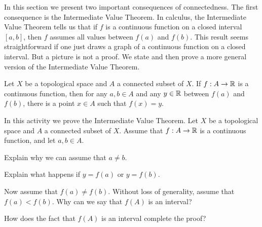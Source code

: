 \label{sec_ivt_fpt}

In this section we present two important consequences of connectedness. The first consequence is the Intermediate Value Theorem. In calculus, the Intermediate Value Theorem tells us that if $f$ is a continuous function on a closed interval $[a,b]$, then $f$ assumes all values between $f(a)$ and $f(b)$. This result seems straightforward if one just draws a graph of a continuous function on a closed interval. But a picture is not a proof. We state and then prove a more general version of the Intermediate Value Theorem. 

\begin{theorem} Let $X$ be a topological space and $A$ a connected subset of $X$. If $f : A \to \mathbb{R}$ is a continuous function, then for any $a,b \in A$ and any $y \in \mathbb{R}$ between $f(a)$ and $f(b)$, there is a point $x \in A$ such that $f(x) = y$. 
\end{theorem}

\begin{activity} In this activity we prove the Intermediate Value Theorem. Let $X$ be a topological space and $A$ a connected subset of $X$. Assume that $f : A \to \mathbb{R}$ is a continuous function, and let $a,b \in A$. \ba
\item Explain why we can assume that $a \neq b$.
  
\item Explain what happens if $y = f(a)$ or $y=f(b)$.

\item Now assume that $f(a) \neq f(b)$. Without loss of generality, assume that $f(a) < f(b)$. Why can we say that $f(A)$ is an interval? 

\item How does the fact that $f(A)$ is an interval complete the proof?

\ea

\end{activity}

\begin{comment}

\ActivitySolution

\ba
\item If $a=b$, then the only $y$ between $f(a)$ and $f(b)$ is $f(a)$, which is a value attained by $f$ on $[a,b]$.
  
\item If $y = f(a)$, then we take $c = a$. If $y = f(b)$, then we take $c=b$. 

\item Since $A$ is connected in $X$, Theorem \ref{thm:connected_invariant} shows that $f(A)$ is a connected subset of $\R$. We proved that the connected subsets of $\R$ are single point sets or intervals. Since $f(a) < f(b)$, we know that $f(A)$ is not a single point set, so $f(A)$ is an interval. 

\item Since $f(A)$ is an interval, it contains all values between $f(a)$ and $f(b)$. So if $f(a) < y < f(b)$, then $y \in f(A)$. 

\ea

\end{comment}


